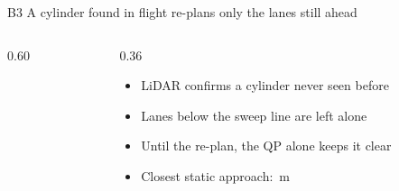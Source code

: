 \documentclass[aspectratio=169,11pt,t]{beamer}
\begin{document}
\begin{frame}{B3 \textperiodcentered{} A cylinder found in flight re-plans only the lanes still ahead}
  \begin{columns}[T,onlytextwidth]
    \begin{column}{0.60\textwidth}
    \end{column}
    \begin{column}{0.36\textwidth}
      \vskip3mm
      \begin{itemize}\bulletgap
        \item LiDAR confirms a cylinder never seen before
        \item Lanes below the sweep line are left alone
        \item Until the re-plan, the QP alone keeps it clear
        \item Closest static approach: \ObssurfRectHinf\,m
      \end{itemize}
    \end{column}
  \end{columns}
\end{frame}
\end{document}
